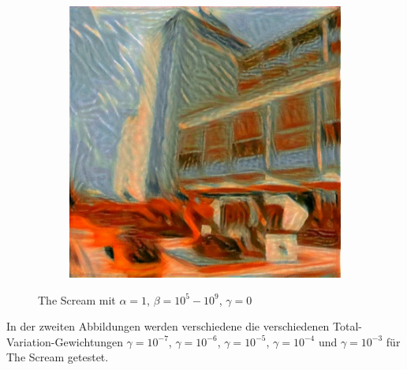 \begin{figure}[H]
\begin{subfigure}[h]{0.15\textwidth}
    \end{subfigure}
    \begin{subfigure}[h]{0.15\textwidth}
        \centering
        \includegraphics[width=\textwidth]{resources/content/experiments/a__the_scream__768x768__style-weight_1e+09__tv-weight_0e+00.jpg}
    \end{subfigure}
    \caption{The Scream mit $ \alpha = 1 $, $ \beta = 10^{5} - 10^{9} $, $ \gamma = 0 $}
\end{figure}

In der zweiten Abbildungen werden verschiedene die verschiedenen Total-Variation-Gewichtungen $ \gamma = 10^{-7} $, $ \gamma = 10^{-6} $, $ \gamma = 10^{-5} $, $ \gamma = 10^{-4} $ und $ \gamma = 10^{-3} $ für The Scream getestet.


